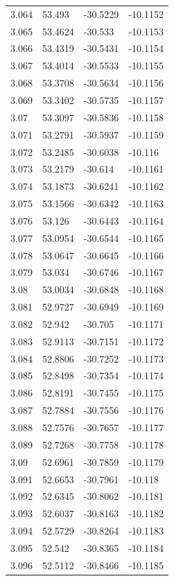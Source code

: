 \begin{tabular}{llll}
3.064 & 53.493 & -30.5229 & -10.1152 \\
3.065 & 53.4624 & -30.533 & -10.1153 \\
3.066 & 53.4319 & -30.5431 & -10.1154 \\
3.067 & 53.4014 & -30.5533 & -10.1155 \\
3.068 & 53.3708 & -30.5634 & -10.1156 \\
3.069 & 53.3402 & -30.5735 & -10.1157 \\
3.07 & 53.3097 & -30.5836 & -10.1158 \\
3.071 & 53.2791 & -30.5937 & -10.1159 \\
3.072 & 53.2485 & -30.6038 & -10.116 \\
3.073 & 53.2179 & -30.614 & -10.1161 \\
3.074 & 53.1873 & -30.6241 & -10.1162 \\
3.075 & 53.1566 & -30.6342 & -10.1163 \\
3.076 & 53.126 & -30.6443 & -10.1164 \\
3.077 & 53.0954 & -30.6544 & -10.1165 \\
3.078 & 53.0647 & -30.6645 & -10.1166 \\
3.079 & 53.034 & -30.6746 & -10.1167 \\
3.08 & 53.0034 & -30.6848 & -10.1168 \\
3.081 & 52.9727 & -30.6949 & -10.1169 \\
3.082 & 52.942 & -30.705 & -10.1171 \\
3.083 & 52.9113 & -30.7151 & -10.1172 \\
3.084 & 52.8806 & -30.7252 & -10.1173 \\
3.085 & 52.8498 & -30.7354 & -10.1174 \\
3.086 & 52.8191 & -30.7455 & -10.1175 \\
3.087 & 52.7884 & -30.7556 & -10.1176 \\
3.088 & 52.7576 & -30.7657 & -10.1177 \\
3.089 & 52.7268 & -30.7758 & -10.1178 \\
3.09 & 52.6961 & -30.7859 & -10.1179 \\
3.091 & 52.6653 & -30.7961 & -10.118 \\
3.092 & 52.6345 & -30.8062 & -10.1181 \\
3.093 & 52.6037 & -30.8163 & -10.1182 \\
3.094 & 52.5729 & -30.8264 & -10.1183 \\
3.095 & 52.542 & -30.8365 & -10.1184 \\
3.096 & 52.5112 & -30.8466 & -10.1185 \\

\end{tabular}
